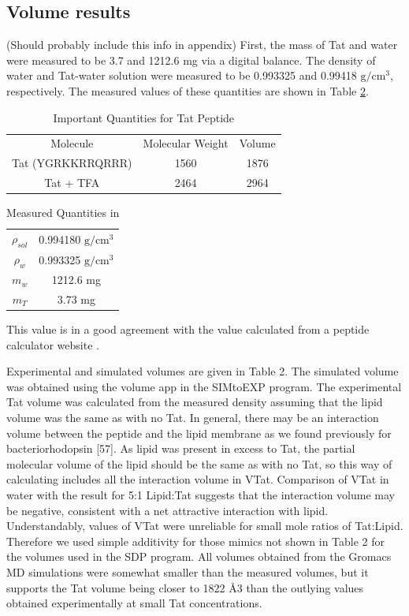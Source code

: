 \subsection{Volume results}\label{sec:volume_results}
(Should probably include this info in appendix)
First, the mass of Tat and water were measured to be 
3.7 and 1212.6 mg via a digital balance. The density of water and 
Tat-water solution were measured to be 0.993325 and 0.99418 $\mathrm{g/cm^3}$,
respectively. The measured values of these quantities
are shown in Table \ref{tb:values}.
\begin{table}[ht]
  \centering
  \begin{tabular}{c c c}
    Molecule & Molecular Weight & Volume \\
    Tat (YGRKKRRQRRR) & 1560 & 1876 \\ 
    Tat + TFA & 2464 & 2964
  \end{tabular}
  \caption{Important Quantities for Tat Peptide}
  \label{tb:Tat}
\end{table}
\begin{table}[ht]
  \centering
  \begin{tabular}{c c}
    $\rho_{sol}$ & 0.994180 $\mathrm{g/cm^3}$\\
    $\rho_w$ & 0.993325 $\mathrm{g/cm^3}$\\
    $m_w$ & 1212.6 mg \\
    $m_T$ & 3.73 mg \\ 
  \end{tabular}
  \caption{Measured Quantities in }
  \label{tb:values}
\end{table}
This value is in a good agreement with the 
value calculated from a peptide calculator website \cite{}. 

Experimental and simulated volumes are given in Table 2. The simulated volume was
obtained using the volume app in the SIMtoEXP program. The experimental Tat volume was
calculated from the measured density assuming that the lipid volume was the same as with no
Tat. In general, there may be an interaction volume between the peptide and the lipid membrane
as we found previously for bacteriorhodopsin [57]. As lipid was present in excess to Tat, the
partial molecular volume of the lipid should be the same as with no Tat, so this way of
calculating includes all the interaction volume in VTat. Comparison of VTat in water with the
result for 5:1 Lipid:Tat suggests that the interaction volume may be negative, consistent with a
net attractive interaction with lipid. Understandably, values of VTat were unreliable for small
mole ratios of Tat:Lipid. Therefore we used simple additivity for those mimics not shown in
Table 2 for the volumes used in the SDP program. All volumes obtained from the Gromacs MD
simulations were somewhat smaller than the measured volumes, but it supports the Tat volume
being closer to 1822 Å3 than the outlying values obtained experimentally at small Tat
concentrations.

